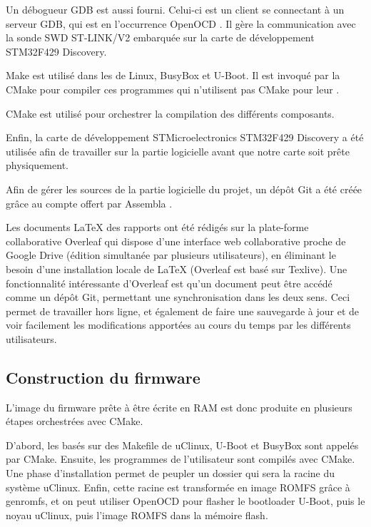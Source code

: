 Un débogueur GDB est aussi fourni.
Celui-ci est un client se connectant à un serveur GDB, qui est en l'occurrence OpenOCD \autocite{OpenOCD}.
Il gère la communication avec la sonde \gls{SWD} ST-LINK/V2 embarquée sur la carte de développement STM32F429 Discovery.
        
Make est utilisé dans les  de Linux, BusyBox et U-Boot.
Il est invoqué par la CMake pour compiler ces programmes qui n'utilisent pas CMake pour leur .
        
CMake est utilisé pour orchestrer la compilation des différents composants.
        
Enfin, la carte de développement STMicroelectronics STM32F429 Discovery a été utilisée afin de travailler sur la partie logicielle avant que notre carte soit prête physiquement.
        
Afin de gérer les sources de la partie logicielle du projet, un dépôt Git a été créée grâce au compte offert par Assembla \autocite{Assembla} .
        
Les documents \LaTeX{} des rapports ont été rédigés sur la plate-forme collaborative Overleaf \autocite{Overleaf} qui dispose d'une interface web collaborative proche de Google Drive (édition simultanée par plusieurs utilisateurs), en éliminant le besoin d'une installation locale de \LaTeX{} (Overleaf est basé sur Texlive).
Une fonctionnalité intéressante d'Overleaf est qu'un document peut être accédé comme un dépôt Git, permettant une synchronisation dans les deux sens.
Ceci permet de travailler hors ligne, et également de faire une sauvegarde à jour et de voir facilement les modifications apportées au cours du temps par les différents utilisateurs.        	

\subsection{Construction du firmware}
L'image du firmware prête à être écrite en RAM est donc produite en plusieurs étapes orchestrées avec CMake.
        
D'abord, les  basés sur des Makefile de uClinux, U-Boot et BusyBox sont appelés par CMake.
Ensuite, les programmes de l'utilisateur sont compilés avec CMake.
Une phase d'installation permet de peupler un dossier qui sera la racine du système uClinux.
Enfin, cette racine est transformée en image ROMFS grâce à genromfs, et on peut utiliser OpenOCD pour flasher le bootloader U-Boot, puis le noyau uClinux, puis l'image ROMFS dans la mémoire flash.

